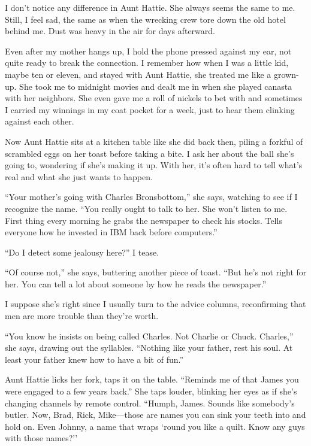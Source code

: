 \documentclass[twoside,10pt]{book}
\begin{document}
I don't notice any difference in Aunt Hattie. She always seems the same
to me. Still, I feel sad, the same as when the wrecking crew tore down
the old hotel behind me. Dust was heavy in the air for days afterward.

Even after my mother hangs up, I hold the phone pressed against my ear,
not quite ready to break the connection. I remember how when I was a
little kid, maybe ten or eleven, and stayed with Aunt Hattie, she
treated me like a grown-up. She took me to midnight movies and dealt me
in when she played canasta with her neighbors. She even gave me a roll
of nickels to bet with and sometimes I carried my winnings in my coat
pocket for a week, just to hear them clinking against each other.

Now Aunt Hattie sits at a kitchen table like she did back then, piling a
forkful of scrambled eggs on her toast before taking a bite. I ask her
about the ball she's going to, wondering if she's making it up. With
her, it's often hard to tell what's real and what she just wants to
happen.

``Your mother's going with Charles Bronsbottom,'' she says, watching to
see if I recognize the name. ``You really ought to talk to her. She
won't listen to me. First thing every morning he grabs the newspaper to
check his stocks. Tells everyone how he invested in IBM back before
computers.''

``Do I detect some jealousy here?'' I tease.

``Of course not,'' she says, buttering another piece of toast. ``But
he's not right for her. You can tell a lot about someone by how he reads
the newspaper.''

I suppose she's right since I usually turn to the advice columns,
reconfirming that men are more trouble than they're worth.

``You know he insists on being called Charles. Not Charlie or Chuck.
Charles,'' she says, draw­ing out the syllables. ``Nothing like your
\clearpage
father, rest his soul. At least your father knew how to have a bit of
fun.''

Aunt Hattie licks her fork, taps it on the table. ``Reminds me of that
James you were engaged to a few years back.'' She taps louder, blinking
her eyes as if she's changing channels by remote con­trol. ``Humph,
James. Sounds like somebody's butler. Now, Brad, Rick, Mike---those are
names you can sink your teeth into and hold on. Even Johnny, a name that
wraps `round you like a quilt. Know any guys with those names?''
\end{document}
